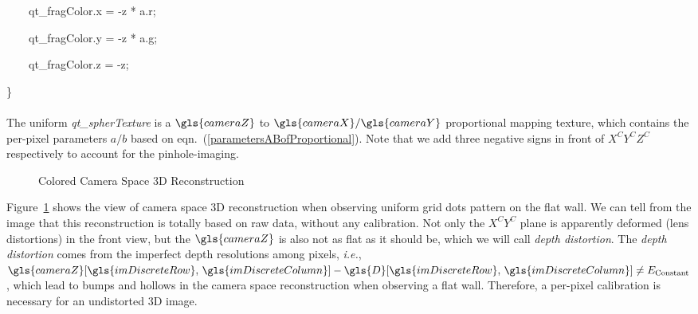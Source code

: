 \bigskip

{\ttfamily
\textcolor[rgb]{0.7529412,0.7529412,0.7529412}{\ \ \ \ }qt\_fragColor.x\textcolor[rgb]{0.7529412,0.7529412,0.7529412}{
} = \textcolor[rgb]{0.7529412,0.7529412,0.7529412}{
}{}-z\textcolor[rgb]{0.7529412,0.7529412,0.7529412}{
}*\textcolor[rgb]{0.7529412,0.7529412,0.7529412}{ }a.r;}

{\ttfamily
\textcolor[rgb]{0.7529412,0.7529412,0.7529412}{\ \ \ \ }qt\_fragColor.y\textcolor[rgb]{0.7529412,0.7529412,0.7529412}{
} = \textcolor[rgb]{0.7529412,0.7529412,0.7529412}{
}{}-z\textcolor[rgb]{0.7529412,0.7529412,0.7529412}{
}*\textcolor[rgb]{0.7529412,0.7529412,0.7529412}{ }a.g;}

{\ttfamily
\textcolor[rgb]{0.7529412,0.7529412,0.7529412}{\ \ \ \ }qt\_fragColor.z\textcolor[rgb]{0.7529412,0.7529412,0.7529412}{
} = \textcolor[rgb]{0.7529412,0.7529412,0.7529412}{ }{}-z;}

{\ttfamily
\}}
\\\\
\indent%
The uniform \emph{qt\_spherTexture} is a \(\gls{cameraZ}\) to \(\gls{cameraX}/\gls{cameraY}\) proportional mapping texture, which contains the per-pixel parameters \(a/b\) based on eqn.~(\ref{parametersABofProportional}). Note that we add three negative signs in front of \(X^CY^CZ^C\) respectively to account for the pinhole-imaging. %
%
\begin{figure}[t]
\centering
{}
\caption{Colored Camera Space \gls{3D} Reconstruction}
\label{reconstructionInCameraSpace}
\end{figure}%
%
Figure~\ref{reconstructionInCameraSpace} shows the view of camera space \gls{3D} reconstruction when observing uniform grid dots pattern on the flat wall. We can tell from the image that this reconstruction is totally based on raw data, without any calibration. Not only the \(X^CY^C\) plane is apparently deformed (lens distortions) in the front view, but the \(\gls{cameraZ}\) is also not as flat as it should be, which we will call \emph{depth distortion}. The \emph{depth distortion} comes from the imperfect depth resolutions among pixels, \textit{i.e.}, \(\gls{cameraZ}  [\gls{imDiscreteRow}, \, \gls{imDiscreteColumn}]  - \gls{D}  [\gls{imDiscreteRow}, \, \gls{imDiscreteColumn}] \neq E_{\text{Constant}}\), which lead to bumps and hollows in the camera space reconstruction when observing a flat wall. Therefore, a per-pixel calibration is necessary for an undistorted \gls{3D} image.

